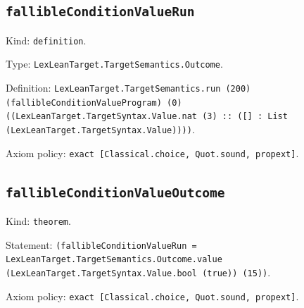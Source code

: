 \documentclass[11pt]{article}
\begin{document}
\subsection*{\texttt{fallibleConditionValueRun}}
\noindent Kind: \texttt{definition}.\par
\noindent Type: \texttt{LexLeanTarget.TargetSemantics.Outcome}.\par
\noindent Definition: \texttt{LexLeanTarget.TargetSemantics.run (200) (fallibleConditionValueProgram) (0) ((LexLeanTarget.TargetSyntax.Value.nat (3) :: ([] : List (LexLeanTarget.TargetSyntax.Value))))}.\par
\noindent Axiom policy: \texttt{exact [Classical.choice, Quot.sound, propext]}.\par
\subsection*{\texttt{fallibleConditionValueOutcome}}
\noindent Kind: \texttt{theorem}.\par
\noindent Statement: \texttt{(fallibleConditionValueRun = LexLeanTarget.TargetSemantics.Outcome.value (LexLeanTarget.TargetSyntax.Value.bool (true)) (15))}.\par
\noindent Axiom policy: \texttt{exact [Classical.choice, Quot.sound, propext]}.\par
\end{document}
